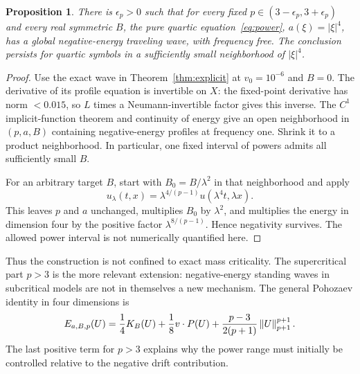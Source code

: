 \documentclass[11pt,a4paper]{article}
\newtheorem{proposition}[theorem]{Proposition}
\theoremstyle{remark}\newtheorem{remark}[theorem]{Remark}
\newcommand{\norm}[1]{\left\|#1\right\|}
\begin{document}
\begin{proposition}\label{prop:power}
There is $\epsilon_p>0$ such that for every fixed $p\in(3-\epsilon_p,3+\epsilon_p)$ and every real symmetric $B$, the pure quartic equation~\eqref{eq:power}, $a(\xi)=|\xi|^4$, has a global negative-energy traveling wave, with frequency free. The conclusion persists for quartic symbols in a sufficiently small neighborhood of $|\xi|^4$.
\end{proposition}
\begin{proof}
Use the exact wave in Theorem~\ref{thm:explicit} at $v_0=10^{-6}$ and $B=0$. The derivative of its profile equation is invertible on $X$: the fixed-point derivative has norm $<0.015$, so $L$ times a Neumann-invertible factor gives this inverse. The $C^1$ implicit-function theorem and continuity of energy give an open neighborhood in $(p,a,B)$ containing negative-energy profiles at frequency one. Shrink it to a product neighborhood. In particular, one fixed interval of powers admits all sufficiently small $B$.

For an arbitrary target $B$, start with $B_0=B/\lambda^2$ in that neighborhood and apply
\[
 u_\lambda(t,x)=\lambda^{4/(p-1)}u(\lambda^4t,\lambda x).
\]
This leaves $p$ and $a$ unchanged, multiplies $B_0$ by $\lambda^2$, and multiplies the energy in dimension four by the positive factor $\lambda^{8/(p-1)}$. Hence negativity survives. The allowed power interval is not numerically quantified here.
\end{proof}

Thus the construction is not confined to exact mass criticality. The supercritical part $p>3$ is the more relevant extension: negative-energy standing waves in subcritical models are not in themselves a new mechanism. The general Pohozaev identity in four dimensions is
\begin{equation}\label{eq:pPoho}
 E_{a,B,p}(U)={1\over4}K_B(U)+{1\over8}v\cdot P(U)
 +{p-3\over2(p+1)}\norm U_{p+1}^{p+1}.
\end{equation}
The last positive term for $p>3$ explains why the power range must initially be controlled relative to the negative drift contribution.
\end{document}
